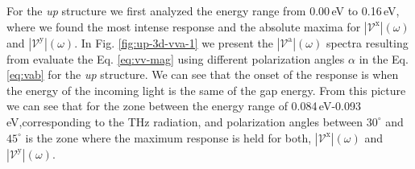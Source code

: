 \documentclass[prb,11pt,tightenlines,twocolumn,aps]{revtex4-1}
\begin{document}
For the \emph{up} structure we first analyzed the energy range from 0.00\,eV to
0.16\,eV, where we found the most intense response and the absolute maxima for
$|\mathcal{V}^{\mathrm{x}}|(\omega)$ and $|\mathcal{V}^{\mathrm{y}}|(\omega)$.
% 
In Fig. \ref{fig:up-3d-vva-1} we present the
$|\mathcal{V}^{\mathrm{a}}|(\omega)$ spectra resulting from evaluate the Eq.
\eqref{eq:vv-mag} using different polarization angles $\alpha$ in the Eq.
\eqref{eq:vab} for the \emph{up} structure. We can see that the onset of the
response is when the energy of the incoming light is the same of the gap energy.
%
From this picture we can see that for the zone between the energy range of
0.084\,eV-0.093\,eV,corresponding to the THz radiation, and polarization angles
between $30^{\circ}$ and $45^{\circ}$ is the zone where the maximum response is
held for both, $|\mathcal{V}^{\mathrm{x}}|(\omega)$ and
$|\mathcal{V}^{\mathrm{y}}|(\omega)$.
\end{document}

